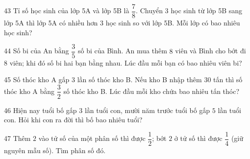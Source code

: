\gap
\begin{probbox}{43}{}
Tỉ số học sinh của lớp 5A và lớp 5B là $\dfrac78$. Chuyển $3$ học sinh từ lớp 5B sang lớp 5A thì lớp 5A có nhiều hơn $3$ học sinh so với lớp 5B. Mỗi lớp có bao nhiêu học sinh?
\end{probbox}
\gap
\begin{probbox}{44}{}
Số bi của An bằng $\dfrac35$ số bi của Bình. An mua thêm $8$ viên và Bình cho bớt đi $8$ viên; khi đó số bi hai bạn bằng nhau. Lúc đầu mỗi bạn có bao nhiêu viên bi?
\end{probbox}
\gap
\begin{probbox}{45}{}
Số thóc kho A gấp $3$ lần số thóc kho B. Nếu kho B nhập thêm $30$ tấn thì số thóc kho A bằng $\dfrac32$ số thóc kho B. Lúc đầu mỗi kho chứa bao nhiêu tấn thóc?
\end{probbox}
\gap
\begin{probbox}{46}{}
Hiện nay tuổi bố gấp $3$ lần tuổi con, mười năm trước tuổi bố gấp $5$ lần tuổi con. Hỏi khi con ra đời thì bố bao nhiêu tuổi?
\end{probbox}
\gap
\begin{probbox}{47}{}
Thêm $2$ vào tử số của một phân số thì được $\dfrac12$; bớt $2$ ở tử số thì được $\dfrac14$ (giữ nguyên mẫu số). Tìm phân số đó.
\end{probbox}
